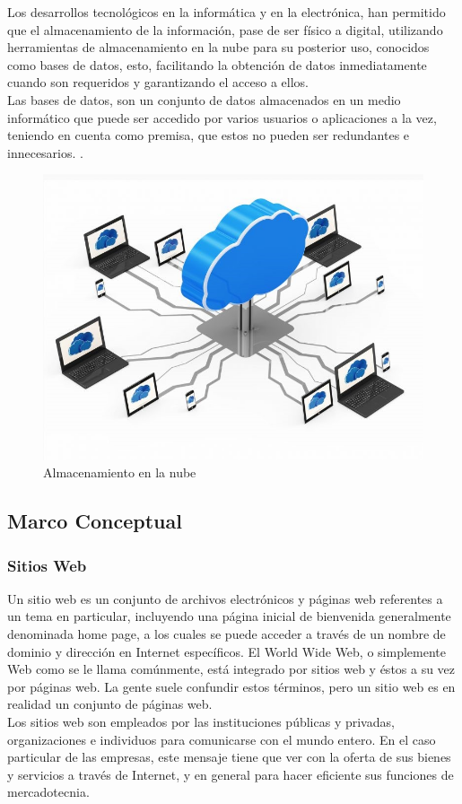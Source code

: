 		{Los desarrollos tecnológicos en la informática y en la electrónica, han permitido que el almacenamiento de la información, pase de ser físico a digital, utilizando herramientas de almacenamiento en la nube para su posterior uso, conocidos como bases de datos, esto, facilitando la obtención de datos inmediatamente cuando son requeridos y garantizando el acceso a ellos.\\
			
		Las bases de datos, son un conjunto de datos almacenados en un medio informático que puede ser accedido por varios usuarios o aplicaciones a la vez, teniendo en cuenta como premisa, que estos no pueden ser redundantes e innecesarios.  \cite{angelData}.\\
		
		\begin{figure}[H]
			\centering
			\includegraphics[width=0.8\linewidth]{description/framework/nube.jpg}
			\caption{Almacenamiento en la nube}
		\end{figure}
	}
		
	
	\subsection{Marco Conceptual}
	
		\subsubsection{Sitios Web}
		
		{Un sitio web es un conjunto de archivos electrónicos y páginas web referentes a un tema en particular, incluyendo una página inicial de bienvenida generalmente denominada home page, a los cuales se puede acceder a través de un nombre de dominio y dirección en Internet específicos. El World Wide Web, o simplemente Web como se le llama comúnmente, está integrado por sitios web y éstos a su vez por páginas web. La gente suele confundir estos términos, pero un sitio web es en realidad un conjunto de páginas web.\\
			
		Los sitios web son empleados por las instituciones públicas y privadas, organizaciones e individuos para comunicarse con el mundo entero. En el caso particular de las empresas, este mensaje tiene que ver con la oferta de sus bienes y servicios a través de Internet, y en general para hacer eficiente sus funciones de mercadotecnia.}
		
